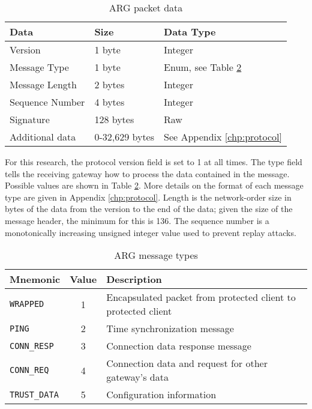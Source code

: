 \begin{table}
\caption{\ac{ARG} packet data}
\label{tab:arg_packet_structure}
\centering
\begin{tabular}{l|l|l}
\textbf{Data} & \textbf{Size} & \textbf{Data Type}\\
\hline
Version & 1 byte & Integer\\
Message Type & 1 byte & Enum, see Table \ref{tbl:arg_protocol_types}\\
Message Length & 2 bytes & Integer\\
Sequence Number & 4 bytes & Integer\\
Signature & 128 bytes & Raw\\
Additional data & 0-32,629 bytes & See Appendix \ref{chp:protocol}
\end{tabular}
\end{table}

\par For this research, the protocol version field is set to 1 at all times. The type field tells the receiving gateway how to process the data contained in the message. Possible values are shown in Table \ref{tbl:arg_protocol_types}. More details on the format of each message type are given in Appendix \ref{chp:protocol}. Length is the network-order size in bytes of the data from the version to the end of the data; given the size of the message header, the minimum for this is 136. The sequence number is a monotonically increasing unsigned integer value used to prevent replay attacks.

\begin{table}
\caption{\ac{ARG} message types}
\label{tbl:arg_protocol_types}
\begin{tabular}{l|c|l}
\textbf{Mnemonic} & \textbf{Value} & \textbf{Description}\\
\hline
\texttt{WRAPPED} & 1 & Encapsulated packet from protected client to protected client\\
\texttt{PING} & 2 & Time synchronization message\\
\texttt{CONN\_RESP} & 3 & Connection data response message\\
\texttt{CONN\_REQ} & 4 & Connection data and request for other gateway's data\\ 
\texttt{TRUST\_DATA} & 5 & Configuration information 
\end{tabular}
\end{table}

